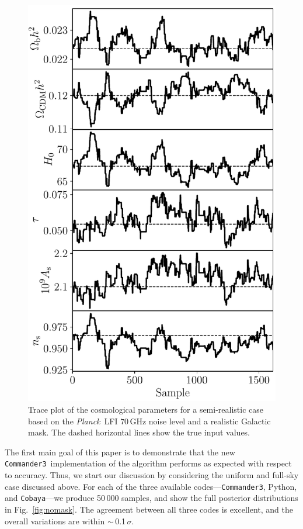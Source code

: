 \documentclass[twocolumn]{aa}
\def\Planck{\emph{Planck}}
\def\commanderthree{\texttt{Commander3}}
\def\cobaya{\texttt{Cobaya}}
\begin{document}
\begin{figure}
	\centering
	\includegraphics[width=\linewidth]{figures/realistic_chain.pdf}
	\caption{\label{fig:traceplot}Trace plot of the cosmological parameters for a semi-realistic case based on the \Planck\ LFI $70\,$GHz noise level and a realistic Galactic mask. The dashed horizontal lines show the true input values.}
\end{figure}


The first main goal of this paper is to demonstrate that the new \commanderthree\ implementation of the \citet{racine:2016} algorithm performs as expected with respect to accuracy. Thus, we start our discussion by considering the uniform and full-sky case discussed above. For each of the three available codes---\commanderthree, Python, and \cobaya---we produce 50\,000 samples, and show the full posterior distributions in Fig.~\ref{fig:nomask}. The agreement between all three codes is excellent, and the overall variations are within $\sim$\,0.1$\,\sigma$.
\end{document}
